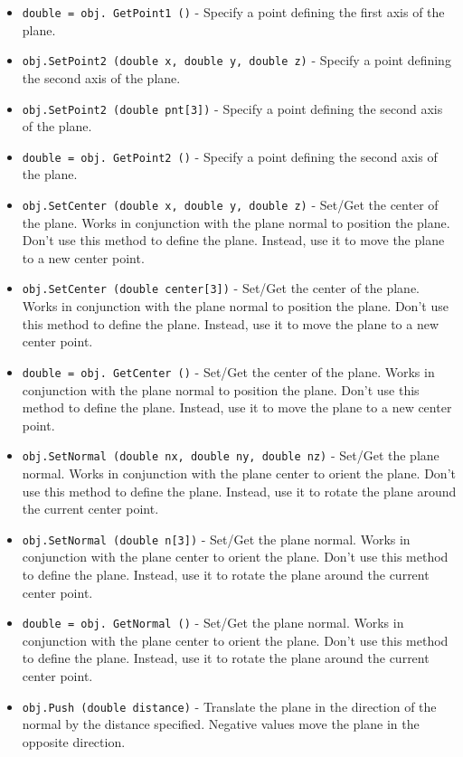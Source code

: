 \begin{itemize}
\item  \verb|double = obj. GetPoint1 ()| -  Specify a point defining the first axis of the plane.

\item  \verb|obj.SetPoint2 (double x, double y, double z)| -  Specify a point defining the second axis of the plane.

\item  \verb|obj.SetPoint2 (double pnt[3])| -  Specify a point defining the second axis of the plane.

\item  \verb|double = obj. GetPoint2 ()| -  Specify a point defining the second axis of the plane.

\item  \verb|obj.SetCenter (double x, double y, double z)| -  Set/Get the center of the plane. Works in conjunction with the plane 
 normal to position the plane. Don't use this method to define the plane.
 Instead, use it to move the plane to a new center point.

\item  \verb|obj.SetCenter (double center[3])| -  Set/Get the center of the plane. Works in conjunction with the plane 
 normal to position the plane. Don't use this method to define the plane.
 Instead, use it to move the plane to a new center point.

\item  \verb|double = obj. GetCenter ()| -  Set/Get the center of the plane. Works in conjunction with the plane 
 normal to position the plane. Don't use this method to define the plane.
 Instead, use it to move the plane to a new center point.

\item  \verb|obj.SetNormal (double nx, double ny, double nz)| -  Set/Get the plane normal. Works in conjunction with the plane center to
 orient the plane. Don't use this method to define the plane. Instead, use
 it to rotate the plane around the current center point.

\item  \verb|obj.SetNormal (double n[3])| -  Set/Get the plane normal. Works in conjunction with the plane center to
 orient the plane. Don't use this method to define the plane. Instead, use
 it to rotate the plane around the current center point.

\item  \verb|double = obj. GetNormal ()| -  Set/Get the plane normal. Works in conjunction with the plane center to
 orient the plane. Don't use this method to define the plane. Instead, use
 it to rotate the plane around the current center point.

\item  \verb|obj.Push (double distance)| -  Translate the plane in the direction of the normal by the
 distance specified.  Negative values move the plane in the
 opposite direction.

\end{itemize}
